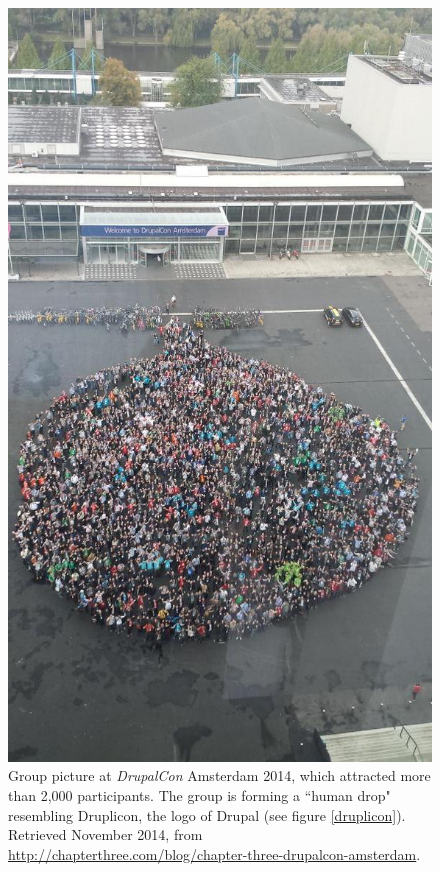 \begin{figure}[H]
	\centering
	\includegraphics[scale=0.32]{img/events/drupalcon_human_drop.jpg}
	\caption[\textit{DrupalCon} Amsterdam 2014]%
    {Group picture at \textit{DrupalCon} Amsterdam 2014, which attracted more than 2,000 participants. The group is forming a ``human drop" resembling Druplicon, the logo of Drupal (see figure \ref{druplicon}). Retrieved  November 2014, from \url{http://chapterthree.com/blog/chapter-three-drupalcon-amsterdam}.}
	\label{drupalcon-amsterdam-2014}
\end{figure}

